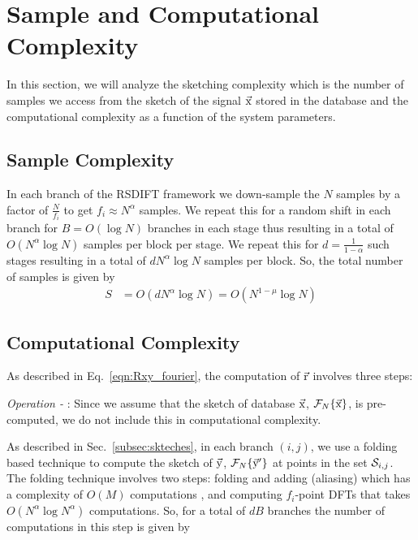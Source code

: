 \section{Sample and Computational Complexity}
\label{Sec:Complexity}
In this section, we will analyze the sketching complexity which is the  number of samples we access from the sketch of the signal $\vec{\mathrm{x}}$ stored in the database and the computational complexity as a function of the system parameters.

\subsection{\bf Sample Complexity}\label{subsec:SampleComplexity}
In each branch of the RSDIFT framework we down-sample the $N$ samples by a factor of $\frac{N}{f_i}$ to get $f_i\approx N^{\alpha}$ samples. We repeat this for a random shift in each branch for $B=O(\log N)$ branches in each stage thus resulting in a total of $O(N^{\alpha}\log N)$ samples per block per stage. We repeat this for $d = \frac{1}{1-\alpha}$ such stages resulting in a total of $dN^{\alpha}\log N$ samples per block. So, the total number of samples is given by
\begin{align*}
S&= O \left(dN^{\alpha}\log N\right) =   O(N^{1-\mu}\log N)
\end{align*}


\subsection{\bf Computational Complexity} \label{subsec:ComputationComplexity}

As described in Eq.~\ref{eqn:Rxy_fourier}, the computation of $\vec{\mathrm{r}}$ involves three steps:

\textit{Operation - }:
	Since we assume that the sketch of database $\vec{\mathrm{x}}$, $\mathcal{F}_{N}\{\vec{\mathrm{x}}\}$, is pre-computed, we do not include this in computational complexity.

	As described in Sec.~\ref{subsec:skteches}, in each branch $(i,j)$, we use a folding based technique to compute the sketch of $\vec{\mathrm{y}}$, $\mathcal{F}_{N}\{\vec{\mathrm{y}}'\}$ at points in the set $\mathcal{S}_{i,j}$. The folding technique involves two steps: folding and adding (aliasing) which has a complexity of $O(M)$ computations , and computing $f_i$-point DFTs that takes $O(N^\alpha \log N^{\alpha})$ computations. So, for a total of $dB$ branches the number of computations in this step is given by
	
